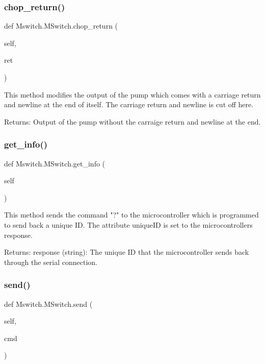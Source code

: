 \subsubsection{\texorpdfstring{chop\_return()}{chop\_return()}}
{\footnotesize\ttfamily def Mswitch.\+M\+Switch.\+chop\+\_\+return (\begin{DoxyParamCaption}\item[{}]{self,  }\item[{}]{ret }\end{DoxyParamCaption})}

\begin{DoxyVerb}This method modifies the output of the pump which comes with a carriage return and newline at the end of itself.
The carriage return and newline is cut off here.

Returns:
    Output of the pump without the carraige return and newline at the end.
\end{DoxyVerb}
 \mbox{\label{class_mswitch_1_1_m_switch_a340f3cb2d10d8fc3681c6f215201d331}} 
\subsubsection{\texorpdfstring{get\_info()}{get\_info()}}
{\footnotesize\ttfamily def Mswitch.\+M\+Switch.\+get\+\_\+info (\begin{DoxyParamCaption}\item[{}]{self }\end{DoxyParamCaption})}

\begin{DoxyVerb}This method sends the command "?" to the microcontroller which is programmed to send back a unique ID. The attribute uniqueID is set to the microcontrollers response.

Returns:
    response (string): The unique ID that the microcontroller sends back through the serial connection.
\end{DoxyVerb}
 \mbox{\label{class_mswitch_1_1_m_switch_a5ed9dff363e8dcc66e12d6d9583ed491}} 
\subsubsection{\texorpdfstring{send()}{send()}}
{\footnotesize\ttfamily def Mswitch.\+M\+Switch.\+send (\begin{DoxyParamCaption}\item[{}]{self,  }\item[{}]{cmd }\end{DoxyParamCaption})}

